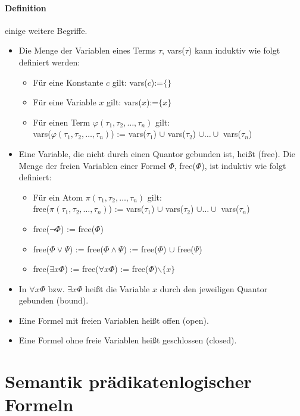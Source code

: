 \documentclass[a4paper,twoside,DIV15,BCOR12mm]{scrbook}
\begin{document}
\paragraph{Definition} einige weitere Begriffe.
\begin{itemize}
\item Die Menge der Variablen eines Terms $\tau$, vars($\tau$) kann induktiv wie folgt definiert werden:
 \begin{itemize}
 \item Für eine Konstante $c$ gilt: vars($c$):=$\{\}$
 \item Für eine Variable $x$ gilt: vars($x$):=$\{x\}$
 \item Für einen Term $\varphi(\tau_1, \tau_2, \ldots, \tau_n)$ gilt: \\vars($\varphi(\tau_1, \tau_2, \ldots, \tau_n)$) := vars($\tau_1$) $\cup$ vars($\tau_2$) $\cup \ldots \cup$ vars($\tau_n$)
 \end{itemize}
\item Eine Variable, die nicht durch einen Quantor gebunden ist, heißt  (free). Die Menge der freien Variablen einer Formel $\Phi$, free($\Phi$), ist induktiv wie folgt definiert:
 \begin{itemize}
 \item Für ein Atom $\pi(\tau_1,\tau_2,\ldots,\tau_n)$ gilt: \\
free($\pi(\tau_1,\tau_2,\ldots,\tau_n)$) := vars($\tau_1$) $\cup$ vars($\tau_2$) $\cup \ldots \cup$ vars($\tau_n$)
 \item free($\neg\Phi$) := free($\Phi$)
 \item free($\Phi\vee\Psi$) := free($\Phi\wedge\Psi$) := free($\Phi$) $\cup$ free($\Psi$)
 \item free($\exists x\Phi$) := free($\forall x\Phi$) := free($\Phi$)$\backslash \{x\}$
 \end{itemize}
\item In $\forall x \Phi$ bzw. $\exists x\Phi$ heißt die Variable $x$ durch den jeweiligen Quantor gebunden (bound).
\item Eine Formel mit freien Variablen heißt offen (open).
\item Eine Formel ohne freie Variablen heißt geschlossen (closed).
\end{itemize}


\section{Semantik prädikatenlogischer Formeln }
\end{document}
